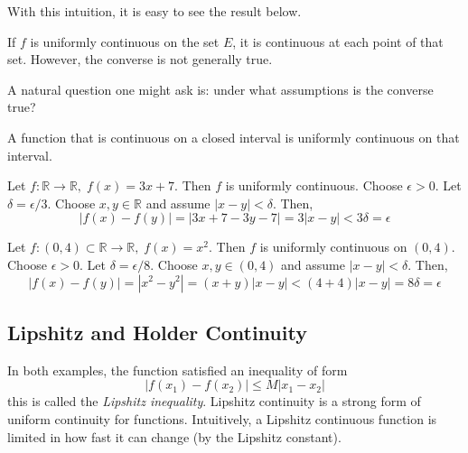   With this intuition, it is easy to see the result below. 

  \begin{lemma}
    If $f$ is uniformly continuous on the set $E$, it is continuous at each point of that set. However, the converse is not generally true. 
  \end{lemma}

  A natural question one might ask is: under what assumptions is the converse true?  

  \begin{theorem}
    A function that is continuous on a closed interval is uniformly continuous on that interval. 
  \end{theorem}

  \begin{example}
    Let $f: \mathbb{R} \longrightarrow \mathbb{R}, \; f(x) = 3x+7$. Then $f$ is uniformly continuous. Choose $\epsilon > 0$. Let $\delta = \epsilon / 3$. Choose $x, y \in \mathbb{R}$ and assume $|x-y| < \delta$. Then, 
    \begin{equation}
      | f(x) - f(y) | = | 3x + 7 - 3 y - 7 | = 3 |x-y| < 3 \delta = \epsilon
    \end{equation}
  \end{example}

  \begin{example}
    Let $f: (0, 4) \subset \mathbb{R} \longrightarrow \mathbb{R}, \; f(x) = x^2$. Then $f$ is uniformly continuous on $(0, 4)$. Choose $\epsilon > 0$. Let $\delta = \epsilon / 8$. Choose $x, y \in (0, 4)$ and assume $|x-y| < \delta$. Then, 
    \begin{equation}
      |f(x) - f(y)| = |x^2 - y^2| = (x+y) |x-y| < (4+4) |x-y| = 8\delta = \epsilon
    \end{equation}
  \end{example}

\subsection{Lipshitz and Holder Continuity}

  In both examples, the function satisfied an inequality of form 
  \begin{equation}
    |f(x_1) - f(x_2)| \leq M |x_1 - x_2|
  \end{equation}
  this is called the \textit{Lipshitz inequality}. Lipshitz continuity is a strong form of uniform continuity for functions. Intuitively, a Lipshitz continuous function is limited in how fast it can change (by the Lipshitz constant). 

